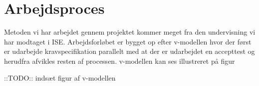 \chapter{Arbejdsproces}

Metoden vi har arbejdet gennem projektet kommer meget fra den undervisning vi har modtaget i ISE. %
Arbejdsforløbet er bygget op efter v-modellen hvor der først er udarbejde kravspecifikation parallelt med at der er udarbejdet en accepttest og herudfra afvikles resten af processen. v-modellen kan ses illustreret på figur %


\begin{large}
::TODO:: indsæt figur af v-modellen
\end{large}
